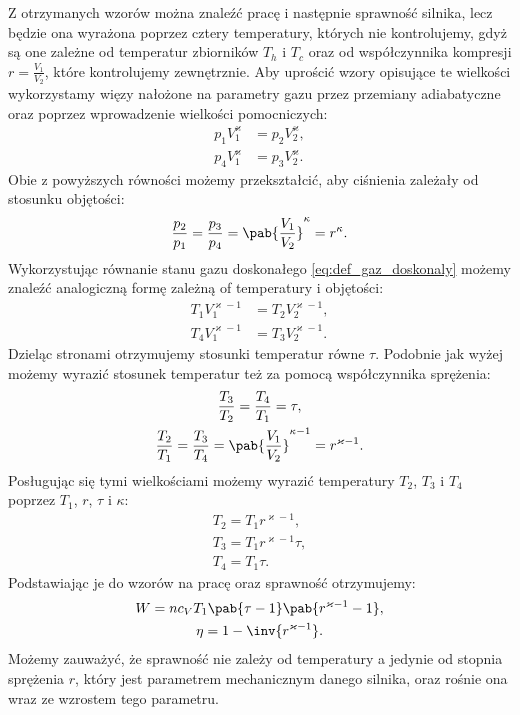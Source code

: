Z otrzymanych wzorów można znaleźć pracę i następnie sprawność silnika, lecz będzie ona wyrażona poprzez cztery temperatury, których nie kontrolujemy, gdyż są one zależne od temperatur zbiorników \(T_h\) i \(T_c\) oraz od współczynnika kompresji \(r = \frac{V_1}{V_2}\), które kontrolujemy zewnętrznie. Aby uprościć wzory opisujące te wielkości wykorzystamy więzy nałożone na parametry gazu przez przemiany adiabatyczne \cite{b:pudlik_termodynamika} oraz poprzez wprowadzenie wielkości pomocniczych:
\begin{equation}
\begin{split}
	p_{1}V_{1}^{\varkappa} &= p_{2}V_{2}^{\varkappa}, \\
	p_{4}V_{1}^{\varkappa} &= p_{3}V_{2}^{\varkappa}.
\end{split}
\end{equation}
Obie z powyższych równości możemy przekształcić, aby ciśnienia zależały od stosunku objętości:
\begin{equation*}
	\frac{p_2}{p_1} = \frac{p_3}{p_4} = \pab{\frac{V_1}{V_2}}^{\kappa} = r^{\kappa}.
\end{equation*}
Wykorzystując równanie stanu gazu doskonałego \eqref{eq:def_gaz_doskonaly} możemy znaleźć analogiczną formę zależną of temperatury i objętości:
\begin{equation}
\begin{split}
	T_{1}V_{1}^{\varkappa-1} &= T_{2}V_{2}^{\varkappa-1}, \\
	T_{4}V_{1}^{\varkappa-1} &= T_{3}V_{2}^{\varkappa-1}.
\end{split}
\end{equation}
Dzieląc stronami otrzymujemy stosunki temperatur równe \(\tau\). Podobnie jak wyżej możemy wyrazić stosunek temperatur też za pomocą współczynnika sprężenia:
\begin{gather}
	\frac{T_3}{T_2} = \frac{T_4}{T_1} = \tau, \\
	\frac{T_2}{T_1} = \frac{T_3}{T_4} = \pab{\frac{V_1}{V_2}}^{\kappa-1} = r^{\varkappa-1} \label{eq:otto_stosunek_T}.
\end{gather}
Posługując się tymi wielkościami możemy wyrazić temperatury \(T_2\), \(T_3\) i \(T_4\) poprzez \(T_1\), \(r\), \(\tau\) i \(\kappa\):
\begin{gather}
	T_2 = T_1 r^{\varkappa-1}, \\
	T_3 = T_1 r^{\varkappa-1} \tau, \\
	T_4 = T_1 \tau.
\end{gather}
Podstawiając je do wzorów na pracę oraz sprawność otrzymujemy:
\begin{gather}
	W = n c_V T_1 \pab{\tau-1} \pab{r^{\varkappa-1}-1}, \label{eq:parametry_otto_W} \\
	\eta = 1 - \inv{r^{\varkappa-1}}. \label{eq:parametry_otto_eta}
\end{gather}
Możemy zauważyć, że sprawność nie zależy od temperatury a jedynie od stopnia sprężenia \(r\), który jest parametrem mechanicznym danego silnika, oraz rośnie ona wraz ze wzrostem tego parametru.

